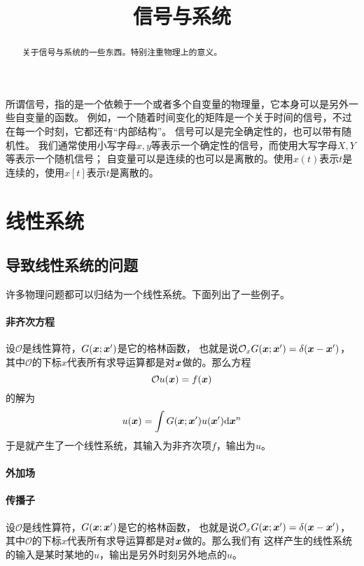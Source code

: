 \documentclass[UTF8]{ctexart}
\title{信号与系统}
\begin{document}
\maketitle
\begin{abstract}
    关于信号与系统的一些东西。特别注重物理上的意义。
\end{abstract}

所谓信号，指的是一个依赖于一个或者多个自变量的物理量，它本身可以是另外一些自变量的函数。
例如，一个随着时间变化的矩阵是一个关于时间的信号，不过在每一个时刻，它都还有“内部结构”。
信号可以是完全确定性的，也可以带有随机性。
我们通常使用小写字母$x, y$等表示一个确定性的信号，而使用大写字母$X, Y$等表示一个随机信号；
自变量可以是连续的也可以是离散的。使用$x(t)$表示$t$是连续的，使用$x[t]$表示$t$是离散的。

\section{线性系统}

\subsection{导致线性系统的问题}

许多物理问题都可以归结为一个线性系统。下面列出了一些例子。

\paragraph{非齐次方程} 设$\mathcal{O}$是线性算符，$G(\vb*{x};\vb*{x}')$是它的格林函数，
也就是说$\mathcal{O}_x G(\vb*{x};\vb*{x}') = \delta(\vb*{x} - \vb*{x}')$，
其中$\mathcal{O}$的下标$x$代表所有求导运算都是对$\vb*{x}$做的。那么方程
\[
    \mathcal{O} u(\vb*{x}) = f(\vb*{x})
\]
的解为
\[
    u(\vb*{x}) = \int G(\vb*{x};\vb*{x}') u(\vb*{x}') \dd \vb*{x}^n
\]
于是就产生了一个线性系统，其输入为非齐次项$f$，输出为$u$。

\paragraph{外加场} 

\paragraph{传播子} 设$\mathcal{O}$是线性算符，$G(\vb*{x};\vb*{x}')$是它的格林函数，
也就是说$\mathcal{O}_x G(\vb*{x};\vb*{x}') = \delta(\vb*{x} - \vb*{x}')$，
其中$\mathcal{O}$的下标$x$代表所有求导运算都是对$\vb*{x}$做的。那么我们有
这样产生的线性系统的输入是某时某地的$u$，输出是另外时刻另外地点的$u$。
\end{document}

